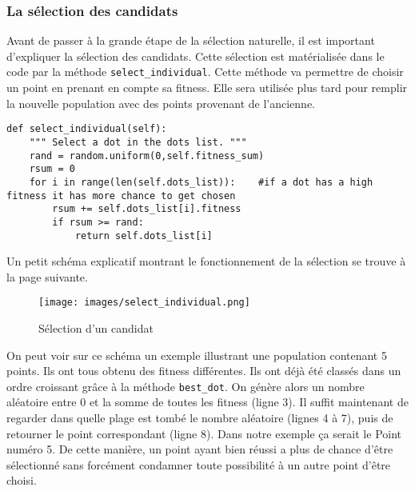 \documentclass[12pt, a4paper, openany]{book}
\begin{document}
\subsubsection{La sélection des candidats}
\label{r:1.4.2-sel}
Avant de passer à la grande étape de la sélection naturelle, il est important d'expliquer la sélection des candidats. Cette sélection est matérialisée dans le code par la méthode \verb'select_individual'. Cette méthode va permettre de choisir un point en prenant en compte sa fitness. Elle sera utilisée plus tard pour remplir la nouvelle population avec des points provenant de l'ancienne.
\begin{verbatim}
def select_individual(self):
	""" Select a dot in the dots list. """
	rand = random.uniform(0,self.fitness_sum)
	rsum = 0
	for i in range(len(self.dots_list)):	#if a dot has a high fitness it has more chance to get chosen
		rsum += self.dots_list[i].fitness
		if rsum >= rand:
			return self.dots_list[i]
\end{verbatim}
Un petit schéma explicatif montrant le fonctionnement de la sélection se trouve à la page suivante.
\begin{figure}[H]
    \centering
    \texttt{[image: images/select\_individual.png]}
    \caption{Sélection d'un candidat}
\end{figure}

\noindent On peut voir sur ce schéma un exemple illustrant une population contenant 5 points. Ils ont tous obtenu des fitness différentes. Ils ont déjà été classés dans un ordre croissant grâce à la méthode \verb'best_dot'. On génère alors un nombre aléatoire entre 0 et la somme de toutes les fitness (ligne 3). Il suffit maintenant de regarder dans quelle plage est tombé le nombre aléatoire (lignes 4 à 7), puis de retourner le point correspondant (ligne 8). Dans notre exemple ça serait le Point numéro 5. De cette manière, un point ayant bien réussi a plus de chance d'être sélectionné sans forcément condamner toute possibilité à un autre point d'être choisi.
\end{document}

